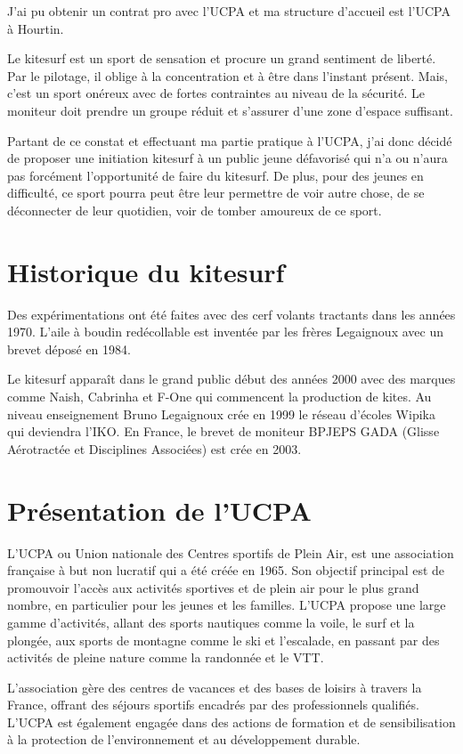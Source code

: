 \documentclass[11pt,a4paper]{report}
\begin{document}
J'ai  pu obtenir un contrat pro avec l'UCPA et 
ma structure d'accueil est l'UCPA à Hourtin.

Le kitesurf est un sport de sensation et procure un grand
sentiment de liberté. Par le pilotage, il oblige à 
la concentration et à \^etre dans l'instant présent.
Mais, c'est un sport onéreux avec de fortes contraintes
au niveau de la sécurité. Le moniteur doit prendre un groupe réduit
et  s'assurer d'une zone  d'espace suffisant. 

Partant de ce constat et effectuant ma partie pratique à l'UCPA,
j'ai donc décidé de proposer une initiation kitesurf à  un public jeune
défavorisé qui n'a ou n'aura pas forcément l'opportunité de faire du kitesurf. 
De plus, pour des jeunes en difficulté, ce sport pourra peut être 
leur permettre de voir autre chose, de se déconnecter de leur quotidien,
voir de tomber amoureux de ce sport.

\section{Historique du kitesurf}
Des expérimentations ont été faites avec des cerf volants tractants 
dans les années 1970. 
L'aile à boudin redécollable est inventée par les frères Legaignoux avec 
un brevet déposé en 1984\cite{brevet_kite}.

Le kitesurf apparaît dans le grand public début des années 2000 avec
des marques comme Naish, Cabrinha et F-One qui commencent la production 
de kites. Au niveau enseignement Bruno Legaignoux crée en 1999 le
réseau d'écoles Wipika qui deviendra l'IKO\cite{iko}.
En France, le brevet de moniteur BPJEPS GADA (Glisse Aérotractée et Disciplines
Associées) est crée en 2003.
\section{Présentation de l'UCPA}

L'UCPA ou Union nationale des Centres sportifs de Plein Air, est une association
française à but non lucratif qui a été créée en 1965. Son objectif principal est
de promouvoir l'accès aux activités sportives et de plein air pour le plus grand
nombre, en particulier pour les jeunes et les familles. L'UCPA propose une large
gamme d'activités, allant des sports nautiques comme la voile, le surf et la plongée,
aux sports de montagne comme le ski et l'escalade, en passant par des activités de
pleine nature comme la randonnée et le VTT.

L'association gère des centres de vacances et des bases de loisirs à travers la
France, offrant des séjours sportifs encadrés par des professionnels qualifiés.
L'UCPA est également engagée dans des actions de formation et de sensibilisation 
à la protection de l'environnement et au développement durable.
\end{document}
